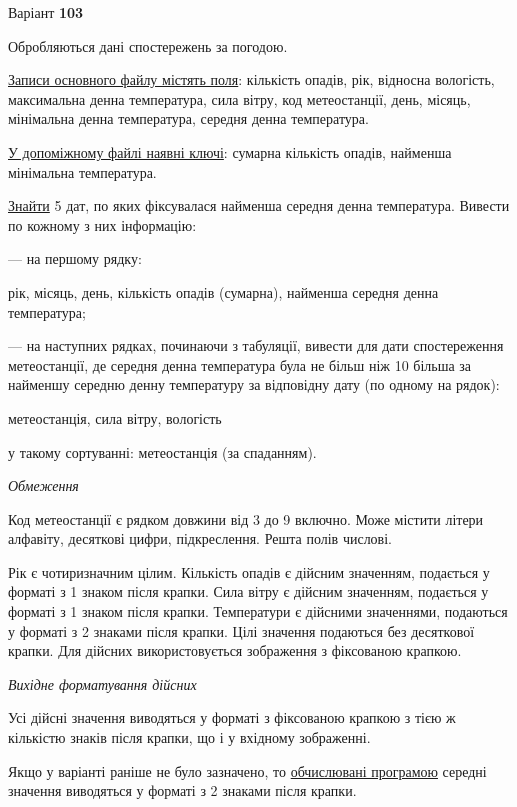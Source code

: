 \documentclass[11pt, ukrainian]{article}
\begin{document}
\par
\newpage
{\center Варіант  \No \textbf { 103 }\par}
\bigskip
Обробляються дані спостережень за погодою. 

\underline{Записи основного файлу містять поля}: кількість опадів, рік, відносна вологість, максимальна денна температура, сила вітру, код метеостанції, день, місяць, мінімальна денна температура, середня денна температура.

\underline{У допоміжному файлі наявні ключі}: сумарна кількість опадів, найменша мінімальна температура.

\underline{Знайти} 5 дат, по яких фіксувалася найменша середня денна температура. Вивести по кожному з них інформацію:\par
{\noindent}--- на першому рядку:\par
рік, місяць, день, кількість опадів (сумарна), найменша середня денна температура;

{\noindent}--- на наступних рядках, починаючи з табуляції, вивести для дати спостереження метеостанції, де середня денна температура була не більш ніж 10 більша за найменшу середню денну температуру за відповідну дату (по одному на рядок):\par
метеостанція, сила вітру, вологість

{\noindent}у такому сортуванні: метеостанція (за спаданням).


\bigskip\textit{Обмеження}

Код метеостанції є рядком довжини від 3 до 9 включно.
Може містити літери алфавіту, десяткові цифри, підкреслення. Решта полів числові.

Рік є чотиризначним цілим.
Кількість опадів є дійсним значенням, подається у форматі з 1 знаком після крапки.
Сила вітру є дійсним значенням, подається у форматі з 1 знаком після крапки.
Температури є дійсними значеннями, подаються у форматі з 2 знаками після крапки.
Цілі значення подаються без десяткової крапки.
Для дійсних використовується зображення з фіксованою крапкою.

\textit{Вихідне форматування дійсних}

Усі дійсні значення виводяться у форматі з фіксованою крапкою з тією ж кількістю знаків після крапки, що і у вхідному зображенні.

Якщо у варіанті раніше не було зазначено, то \underline{обчислювані програмою} середні значення виводяться у форматі з 2 знаками після крапки.
\end{document}
